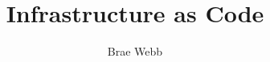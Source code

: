 \documentclass{csse4400}
\title{Infrastructure as Code}
\author{Brae Webb}
\date{\week{4}}
\begin{document}
\makecover



% 
% 
\end{document}
